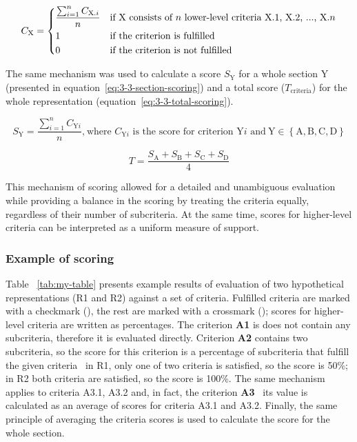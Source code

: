 \begin{equation}
    C_\text{X} =
\begin{dcases}
    \frac{\sum_{i=1}^{n} C_{\text{X.$i$}}}{n} & \text{if X consists of $n$ lower-level criteria X.1, X.2, ..., X.$n$}\\
    1                                         & \text{if the criterion is fulfilled}\\
    0                                         & \text{if the criterion is not fulfilled}
\end{dcases}
    \label{eq:3-3-criterion-scoring}
\end{equation}

The same mechanism was used to calculate a score $S_{\text{Y}}$ for a whole section Y (presented in equation~\ref{eq:3-3-section-scoring}) and a total score ($T_{\text{criteria}}$) for the whole representation (equation~\ref{eq:3-3-total-scoring}).

\begin{equation}
    S_{\text{Y}} = \frac{\sum_{i=1}^{n} C_{\text{Y$i$}}}{n}\text{,}\ \text{where $C_{\text{Y$i$}}$ is the score for criterion Y$i$ and}\ \text{Y} \in \left\{\text{A}, \text{B}, \text{C}, \text{D} \right\}
    \label{eq:3-3-section-scoring}
\end{equation}

\begin{equation}
    T = \frac{S_{\text{A}} + S_{\text{B}} + S_{\text{C}} + S_{\text{D}}}{4}
    \label{eq:3-3-total-scoring}
\end{equation}

This mechanism of scoring allowed for a detailed and unambiguous evaluation while providing a balance in the scoring by treating the criteria equally, regardless of their number of subcriteria.
At the same time, scores for higher-level criteria can be interpreted as a uniform measure of support.

\subsubsection{Example of scoring}
Table ~\ref{tab:my-table} presents example results of evaluation of two hypothetical representations (R1 and R2) against a set of criteria.
Fulfilled criteria are marked with a checkmark (\cmark), the rest are marked with a crossmark (\xmark);
scores for higher-level criteria are written as percentages.
The criterion \textbf{A1} is does not contain any subcriteria, therefore it is evaluated directly.
Criterion \textbf{A2} contains two subcriteria, so the score for this criterion is a percentage of subcriteria that fulfill the given criteria \textendash\ in R1, only one of two criteria is satisfied, so the score is 50\%; in R2 both criteria are satisfied, so the score is 100\%.
The same mechanism applies to criteria A3.1, A3.2 and, in fact, the criterion \textbf{A3} \textendash\ its value is calculated as an average of scores for criteria A3.1 and A3.2.
Finally, the same principle of averaging the criteria scores is used to calculate the score for the whole section.


